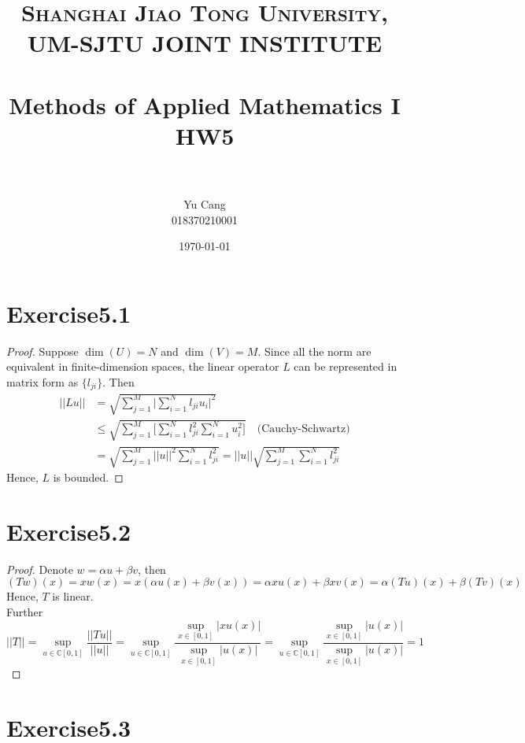 \documentclass[paper=a4, fontsize=11pt]{scrartcl} %
\title{	
\normalfont \normalsize 
\textsc{Shanghai Jiao Tong University, UM-SJTU JOINT INSTITUTE} \\ [25pt] %
\horrule{0.5pt} \\[0.4cm] %
\huge Methods of Applied Mathematics I\\ HW5 \\ %
\horrule{2pt} \\[0.5cm] %
}
\author{Yu Cang \\ 018370210001} %
\date{\normalsize \today} %
\numberwithin{equation}{section} %
\numberwithin{figure}{section} %
\numberwithin{table}{section} %
\begin{document}
\maketitle %

\section{Exercise5.1}
	\begin{proof}
		Suppose $\dim(U) = N$ and $\dim(V)=M$. Since all the norm are equivalent in finite-dimension spaces, the linear operator $L$ can be represented in matrix form as $\{l_{ji}\}$. Then
		\begin{equation}
			\begin{aligned}
				||Lu|| & = \sqrt{\sum_{j=1}^{M}\Big|\sum_{i=1}^{N}l_{ji} u_i\Big|^2}\\
					   & \leq \sqrt{\sum_{j=1}^{M} \Big[\sum_{i=1}^{N} l_{ji}^2 \sum_{i=1}^{N} u_{i}^2\Big]} \quad \text{(Cauchy-Schwartz)}\\
					   & = \sqrt{\sum_{j=1}^{M} ||u||^2\sum_{i=1}^{N} l_{ji}^2}
					    = ||u||\sqrt{\sum_{j=1}^{M}\sum_{i=1}^{N} l_{ji}^2}
			\end{aligned}
		\end{equation}
		Hence, $L$ is bounded.
	\end{proof}

\section{Exercise5.2}
	\begin{proof}
		Denote $w = \alpha u + \beta v$, then
		\begin{equation}
			(Tw)(x) = xw(x) = x(\alpha u(x) + \beta v(x)) = \alpha xu(x) + \beta xv(x) = \alpha (Tu)(x) + \beta (Tv)(x)
		\end{equation}
		Hence, $T$ is linear.\\ Further
		\begin{equation}
			||T|| = \sup_{u\in\mathbb{C}[0, 1]}\frac{||Tu||}{||u||} = \sup_{u\in\mathbb{C}[0, 1]} \frac{\sup_{x\in[0, 1]}|xu(x)|}{\sup_{x\in[0, 1]}|u(x)|} = \sup_{u\in\mathbb{C}[0, 1]} \frac{\sup_{x\in[0, 1]}|u(x)|}{\sup_{x\in[0, 1]}|u(x)|} = 1
		\end{equation}
	\end{proof}

\section{Exercise5.3}
\end{document}
